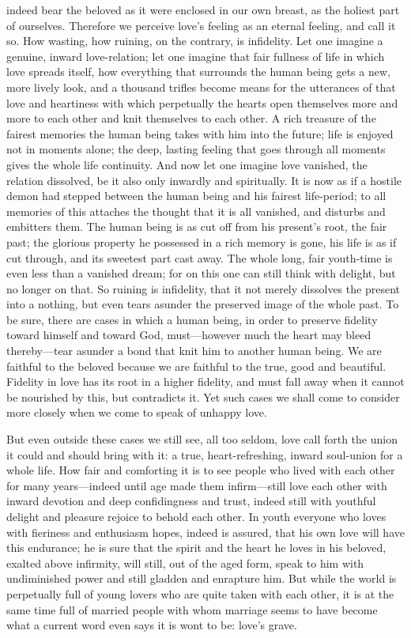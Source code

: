 \documentclass[12pt,a4paper]{book}
\begin{document}
indeed bear the beloved as it were enclosed in our own breast, as the
holiest part of ourselves. Therefore we perceive love's feeling as an
eternal feeling, and call it so. How wasting, how ruining, on the contrary,
is infidelity. Let one imagine a genuine, inward love-relation; let one
imagine that fair fullness of life in which love spreads itself, how
everything that surrounds the human being gets a new, more lively look, and
a thousand trifles become means for the utterances of that love and
heartiness with which perpetually the hearts open themselves more and more
to each other and knit themselves to each other. A rich treasure of the
fairest memories the human being takes with him into the future; life is
enjoyed not in moments alone; the deep, lasting feeling that goes through
all moments gives the whole life continuity. And now let one imagine love
vanished, the relation dissolved, be it also only inwardly and spiritually.
It is now as if a hostile demon had stepped between the human being and his
fairest life-period; to all memories of this attaches the thought that it
is all vanished, and disturbs and embitters them. The human being is as
cut off from his present's root, the fair past; the glorious property he
possessed in a rich memory is gone, his life is as if cut through, and its
sweetest part cast away. The whole long, fair youth-time is even less than
a vanished dream; for on this one can still think with delight, but no
longer on that. So ruining is infidelity, that it not merely dissolves the
present into a nothing, but even tears asunder the preserved image of the
whole past. To be sure, there are cases in which a human being, in order to
preserve fidelity toward himself and toward God, must---however much the
heart may bleed thereby---tear asunder a bond that knit him to another human
being. We are faithful to the beloved because we are faithful to the true,
good and beautiful. Fidelity in love has its root in a higher fidelity, and
must fall away when it cannot be nourished by this, but contradicts it. Yet
such cases we shall come to consider more closely when we come to speak of
unhappy love.

But even outside these cases we still see, all too seldom, love call forth
the union it could and should bring with it: a true, heart-refreshing,
inward soul-union for a whole life. How fair and comforting it is to see
people who lived with each other for many years---indeed until age made them
infirm---still love each other with inward devotion and deep confidingness
and trust, indeed still with youthful delight and pleasure rejoice to
behold each other. In youth everyone who loves with fieriness and
enthusiasm hopes, indeed is assured, that his own love will have this
endurance; he is sure that the spirit and the heart he loves in his
beloved, exalted above infirmity, will still, out of the aged form, speak
to him with undiminished power and still gladden and enrapture him. But
while the world is perpetually full of young lovers who are quite taken
with each other, it is at the same time full of married people with whom
marriage seems to have become what a current word even says it is wont to
be: love's grave.
\end{document}
